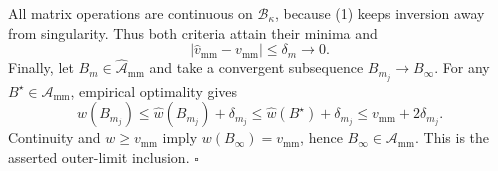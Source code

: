 All matrix operations are continuous on \(\mathcal B_\kappa\), because (1) keeps inversion away from singularity.  Thus both criteria attain their minima and
\[
 \lvert\widehat v_{\mathrm{mm}}-v_{\mathrm{mm}}\rvert\le\delta_m\to0. \tag{7}
\]
Finally, let \(B_m\in\widehat{\mathcal A}_{\mathrm{mm}}\) and take a convergent subsequence \(B_{m_j}\to B_\infty\).  For any \(B^\star\in\mathcal A_{\mathrm{mm}}\), empirical optimality gives
\[
 w(B_{m_j})\le\widehat w(B_{m_j})+\delta_{m_j}
 \le\widehat w(B^\star)+\delta_{m_j}
 \le v_{\mathrm{mm}}+2\delta_{m_j}.
\]
Continuity and \(w\ge v_{\mathrm{mm}}\) imply \(w(B_\infty)=v_{\mathrm{mm}}\), hence \(B_\infty\in\mathcal A_{\mathrm{mm}}\).  This is the asserted outer-limit inclusion. \(\square\)